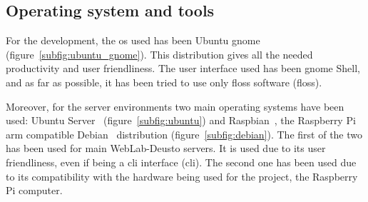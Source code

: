 \subsection{Operating system and tools}

For the development, the \acrlong{os} used has been Ubuntu \acrshort{gnome}~\cite{ubuntu_gnome_web}
(figure~\ref{subfig:ubuntu_gnome}). This distribution gives all the needed productivity and user
friendliness. The user interface used has been \acrshort{gnome} Shell, and as far as possible, it
has been tried to use only \acrshort{floss} software (\acrlong{floss}).

Moreover, for the server environments two main operating systems have been used: Ubuntu
Server~\cite{ubuntu_web} (figure~\ref{subfig:ubuntu}) and Raspbian~\cite{raspbian_web}, the
Raspberry Pi \acrshort{arm} compatible Debian~\cite{debian_web} distribution
(figure~\ref{subfig:debian}). The first of the two has been used for main WebLab-Deusto servers. It
is used due to its user friendliness, even if being a \acrshort{cli} interface (\acrlong{cli}). The
second one has been used due to its compatibility with the hardware being used for the project, the
Raspberry Pi computer.

